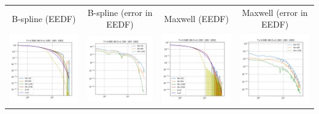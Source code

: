 \documentclass[landscape,archE,fontscale=0.285]{baposter} %
\begin{document}
\begin{poster}
{\begin{itemize}[leftmargin=*]
\end{itemize}
\begin{tabular}{cccc}
B-spline (EEDF) & B-spline (error in EEDF)& Maxwell (EEDF) & Maxwell (error in EEDF) \\
\includegraphics[width=.22\textwidth]{img/vspace__bspline_eedf.png}&
\includegraphics[width=.22\textwidth]{img/vspace__bspline_eedf_conv.png} &
\includegraphics[width=.22\textwidth]{img/vspace__maxwell_eedf.png} &
\includegraphics[width=.22\textwidth]{img/vspace__maxwell_eedf_conv.png}
\end{tabular}

}



%


\end{poster}
\end{document}
